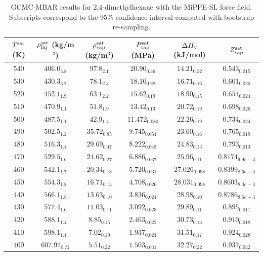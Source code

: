 \documentclass[journal=jctc,manuscript=article]{achemso}
\begin{document}
\begin{table}[htb!]
	\caption{GCMC-MBAR results for 2,4-dimethylhexane with the MiPPE-SL force field. Subscripts correspond to the 95\% confidence interval computed with bootstrap re-sampling.}
	\begin{center}
		\begin{tabular}{|c|c|c|c|c|c|}
			\hline
			$T^{\rm sat}$ (K) & $\rho_{\rm liq}^{\rm sat}$ (kg/m$^3$) & $\rho_{\rm vap}^{\rm sat}$ (kg/m$^3$) & $P_{\rm vap}^{\rm sat}$ (MPa) & $\Delta H_{\rm v}$ (kJ/mol) & $Z_{\rm vap}^{\rm sat}$ \\ \hline
			540 & $406.0_{3.8}$ & $97.8_{2.1}$ & $20.90_{0.36}$ & $14.21_{0.22}$ & $0.543_{0.015}$ \\
			530 & $430.3_{3.2}$ & $78.1_{2.3}$ & $18.10_{0.28}$ & $16.71_{0.16}$ & $0.601_{0.020}$ \\
			520 & $452.1_{1.9}$ & $63.1_{2.2}$ & $15.62_{0.19}$ & $18.90_{0.15}$ & $0.654_{0.024}$ \\
			510 & $470.9_{1.1}$ & $51.8_{1.9}$ & $13.42_{0.13}$ & $20.72_{0.19}$ & $0.698_{0.026}$ \\
			500 & $487.5_{1.1}$ & $42.9_{1.4}$ & $11.472_{0.080}$ & $22.26_{0.19}$ & $0.734_{0.024}$ \\
			490 & $502.5_{1.2}$ & $35.72_{0.85}$ & $9.745_{0.054}$ & $23.60_{0.16}$ & $0.765_{0.019}$ \\
			480 & $516.3_{1.4}$ & $29.69_{0.47}$ & $8.222_{0.043}$ & $24.83_{0.13}$ & $0.793_{0.013}$ \\
			470 & $529.5_{1.6}$ & $24.62_{0.27}$ & $6.886_{0.037}$ & $25.96_{0.11}$ & $0.8174_{9.9e-3}$ \\
			460 & $542.1_{1.7}$ & $20.34_{0.18}$ & $5.720_{0.031}$ & $27.026_{0.098}$ & $0.8399_{8.6e-3}$ \\
			450 & $554.3_{1.8}$ & $16.71_{0.13}$ & $4.708_{0.026}$ & $28.031_{0.098}$ & $0.8603_{8.3e-3}$ \\
			440 & $566.1_{1.8}$ & $13.63_{0.10}$ & $3.836_{0.024}$ & $28.98_{0.10}$ & $0.8786_{8.6e-3}$ \\
			430 & $577.4_{1.6}$ & $11.03_{0.11}$ & $3.092_{0.023}$ & $29.89_{0.11}$ & $0.895_{0.011}$ \\
			420 & $588.1_{1.4}$ & $8.85_{0.15}$ & $2.463_{0.022}$ & $30.73_{0.13}$ & $0.910_{0.018}$ \\
			410 & $598.1_{1.1}$ & $7.02_{0.19}$ & $1.937_{0.024}$ & $31.51_{0.17}$ & $0.924_{0.028}$ \\
			400 & $607.97_{0.72}$ & $5.51_{0.22}$ & $1.503_{0.031}$ & $32.27_{0.22}$ & $0.937_{0.042}$ \\

\end{tabular}
\end{center}
\end{table}
\end{document}
